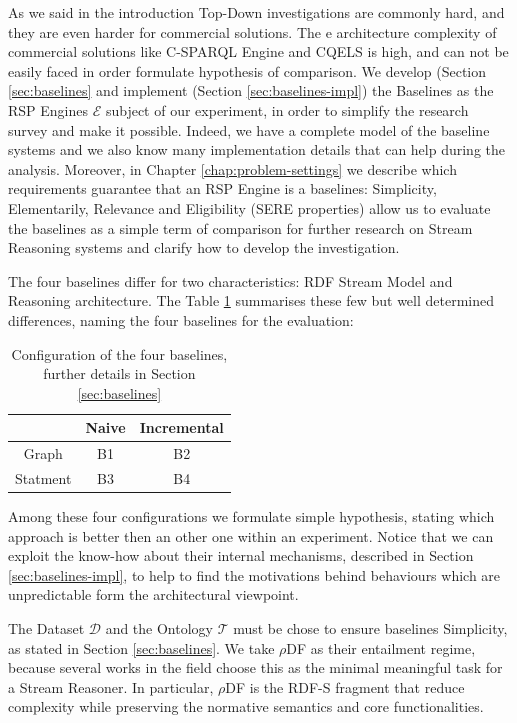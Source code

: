 As we said in the introduction Top-Down investigations are commonly hard, and they are even harder for commercial solutions. The e architecture complexity of commercial solutions like C-SPARQL Engine and CQELS is high, and can not be easily faced in order formulate hypothesis of comparison.
We develop (Section \ref{sec:baselines} and implement (Section \ref{sec:baselines-impl}) the Baselines as the RSP Engines $\mathcal{E}$ subject of our experiment, in order to simplify the research survey and make it possible. Indeed, we have a complete model of the baseline systems and we also know many implementation details that can help during the analysis. Moreover, in Chapter \ref{chap:problem-settings} we describe which requirements guarantee that an RSP Engine is a baselines: Simplicity, Elementarily, Relevance and Eligibility (SERE properties) allow us to evaluate the baselines as a simple term of comparison for further research on Stream Reasoning systems and clarify how to develop the investigation.
 
The four baselines differ for two characteristics: RDF Stream Model and Reasoning architecture. The Table \ref{tab:baselines-names} summarises these few but well determined differences, naming the four baselines for the evaluation:\begin{table}[htb]
\scriptsize
\centering
\begin{tabular}{c|cc} %
	\hline
         & Naive & Incremental\\
	\hline
	Graph        &  B1      & B2\\
	Statment   &  B3   & B4\\
	\hline %
\end{tabular}
\caption{Configuration of the four baselines, further details in Section \ref{sec:baselines}}
\label{tab:baselines-names}
\end{table}

\noindent Among these four configurations we formulate simple hypothesis, stating which approach is better then an other one within an experiment. Notice that we can exploit the know-how about their internal mechanisms, described in Section \ref{sec:baselines-impl}, to help to find the motivations behind behaviours which are unpredictable form the architectural viewpoint. 

The Dataset  $\mathcal{D}$ and the Ontology $\mathcal{T}$ must be chose to ensure baselines Simplicity, as stated in Section \ref{sec:baselines}. We take $\rho$DF  \cite{DBLP:conf/esws/MunozPG07} as their entailment regime, because several works in the field \cite{DBLP:conf/semweb/UrbaniMJHB13} choose this as the minimal meaningful task for a Stream Reasoner. In particular, $\rho$DF is the RDF-S fragment that reduce complexity while preserving the normative semantics and core functionalities. 

